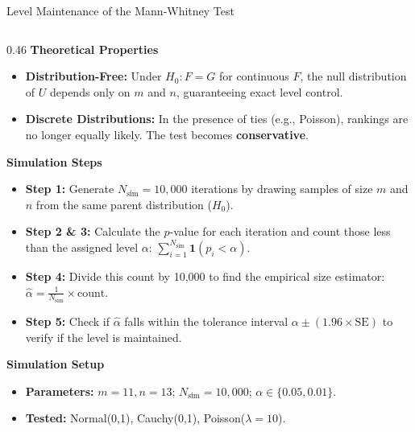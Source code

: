 \documentclass[8pt]{beamer}
\begin{document}
\begin{frame}{Level Maintenance of the Mann-Whitney Test}
    \vspace{-0.2cm}
    \begin{columns}[T]
        \begin{column}{0.46\textwidth}
            \scriptsize
            \textbf{Theoretical Properties}
            \begin{itemize}
                \item \textbf{Distribution-Free:} Under $H_0: F = G$ for continuous $F$, the null distribution of $U$ depends only on $m$ and $n$, guaranteeing exact level control.
                \item \textbf{Discrete Distributions:} In the presence of ties (e.g., Poisson), rankings are no longer equally likely. The test becomes \textbf{conservative}.
            \end{itemize}
            
            \vspace{0.1cm}
            \textbf{Simulation Steps}
            \begin{itemize}
                \item \textbf{Step 1:} Generate $N_{\text{sim}} = 10,000$ iterations by drawing samples of size $m$ and $n$ from the same parent distribution ($H_0$).
                \item \textbf{Step 2 \& 3:} Calculate the $p$-value for each iteration and count those less than the assigned level $\alpha$: $\sum_{i=1}^{N_{\text{sim}}} \mathbf{1}(p_i < \alpha)$.
                \item \textbf{Step 4:} Divide this count by 10,000 to find the empirical size estimator: $\widehat{\alpha} = \frac{1}{N_{\text{sim}}} \times \text{count}$.
                \item \textbf{Step 5:} Check if $\widehat{\alpha}$ falls within the tolerance interval $\alpha \pm (1.96 \times \text{SE})$ to verify if the level is maintained.
            \end{itemize}

            \vspace{0.1cm}
            \textbf{Simulation Setup}
            \begin{itemize}
                \item \textbf{Parameters:} $m = 11, n = 13$; $N_{\text{sim}} = 10,000$; $\alpha \in \{0.05, 0.01\}$.
                \item \textbf{Tested:} Normal(0,1), Cauchy(0,1), Poisson($\lambda=10$).
            \end{itemize}
        \end{column}


\end{columns}
\end{frame}
\end{document}
